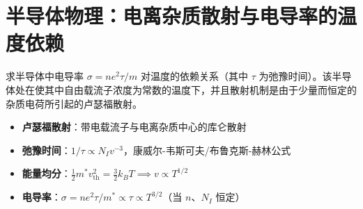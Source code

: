 \section{半导体物理：电离杂质散射与电导率的温度依赖}
\label{sec:ionized-impurity-scattering}

\begin{modelbox}[题目：电离杂质散射主导下的电导率温度关系]
求半导体中电导率 $\sigma=ne^2\tau/m$ 对温度的依赖关系（其中 $\tau$ 为弛豫时间）。该半导体处在使其中自由载流子浓度为常数的温度下，并且散射机制是由于少量而恒定的杂质电荷所引起的卢瑟福散射。
\end{modelbox}

\begin{tipbox}[考点快速分析]
\begin{itemize}
    \item \textbf{卢瑟福散射}：带电载流子与电离杂质中心的库仑散射
    \item \textbf{弛豫时间}：$1/\tau\propto N_Iv^{-3}$，康威尔-韦斯可夫/布鲁克斯-赫林公式
    \item \textbf{能量均分}：$\frac{1}{2}m^*v_{\text{th}}^2=\frac{3}{2}k_BT\implies v\propto T^{1/2}$
    \item \textbf{电导率}：$\sigma=ne^2\tau/m^*\propto\tau\propto T^{3/2}$（当 $n$、$N_I$ 恒定）
\end{itemize}
\end{tipbox}

